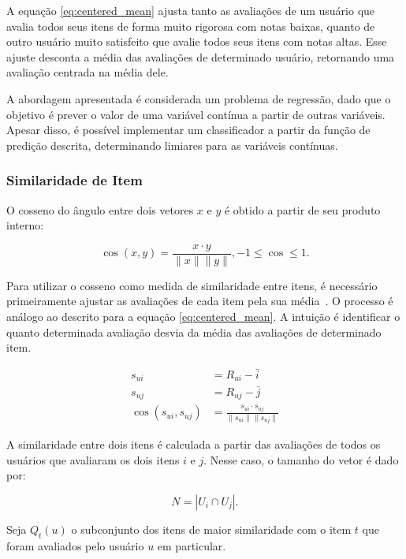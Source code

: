 A equação \ref{eq:centered_mean} ajusta tanto as avaliações de um usuário que
avalia todos seus itens de forma muito rigorosa com notas baixas, quanto de
outro usuário muito satisfeito que avalie todos seus itens com notas altas. Esse
ajuste desconta a média das avaliações de determinado usuário, retornando uma
avaliação centrada na média dele.

A abordagem apresentada é considerada um problema de regressão, dado que o objetivo é prever
o valor de uma variável contínua a partir de outras variáveis. Apesar disso, é
possível implementar um classificador a partir da função de predição descrita,
determinando limiares para as variáveis contínuas.

\subsubsection{Similaridade de Item}

O cosseno do ângulo entre dois vetores $x$ e $y$ é obtido a partir de seu
produto interno:

\begin{equation}
    \cos(x,y) = \frac{x \cdot y}{\|x\| \|y\|}, -1 \leq \cos \leq 1.
\end{equation}

Para utilizar o cosseno como medida de similaridade entre itens, é necessário
primeiramente ajustar as avaliações de cada item pela sua
média~\cite{aggarwal2016recommender}. O processo é análogo ao descrito para a
equação \ref{eq:centered_mean}. A intuição é identificar o quanto determinada
avaliação desvia da média das avaliações de determinado item.

\begin{align}
    s_{ui} &= R_{ui} - \bar{i} \\
    s_{uj} &= R_{uj} - \bar{j} \\
    \cos(s_{ui},s_{uj}) &= \frac{s_{ui} \cdot s_{uj}}{\|s_{ui}\| \|s_{uj}\|}
\end{align}

A similaridade entre dois itens é calculada a partir das avaliações de todos os
usuários que avaliaram os dois itens $i$ e $j$. Nesse caso, o tamanho do vetor é dado por:

\begin{equation}
    N = |U_i \cap U_j|.
\end{equation}

Seja $Q_t (u)$ o subconjunto dos itens de maior similaridade com o item $t$ que
foram avaliados pelo usuário $u$ em particular.


